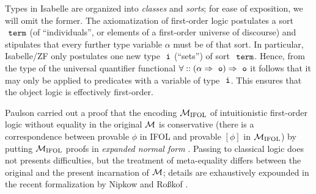 Types in Isabelle are organized into \emph{classes} and \emph{sorts};
for ease of exposition, we will omit the former.  The axiomatization
of first-order logic postulates a sort $\type{term}$ (of
“individuals”, or elements of a first-order universe of discourse) and
stipulates that every further type variable $\alpha$ must be of that
sort. In particular, Isabelle/ZF only postulates one new type $\tyi$
(“sets”) of sort $\type{term}$. Hence, from the type of the universal
quantifier functional $\forall :: (\alpha \fun \tyo) \fun \tyo$ it
follows that it may only be applied to predicates with a variable of
type $\tyi$. This ensures that the object logic is effectively
first-order.

Paulson  \cite{Paulson1989} carried out a proof that the encoding
$\mathcal{M}_{\mathrm{IFOL}}$ of
intuitionistic first-order logic without equality in the original $\mathcal{M}$ is
conservative (there is a correspondence between provable $\phi$ in
IFOL and provable $[\phi]$ in $\mathcal{M}_{\mathrm{IFOL}}$) by putting
$\mathcal{M}_{\mathrm{IFOL}}$ proofs in \emph{expanded normal form}
\cite{MR0387024}. Passing to classical logic does not presents
difficulties, but the treatment of meta-equality differs between the
original and the present incarnation of $\mathcal{M}$; details are
exhaustively expounded in the recent formalization by Nipkow and
Roßkof \cite{10.1007/978-3-030-79876-5_6}.



